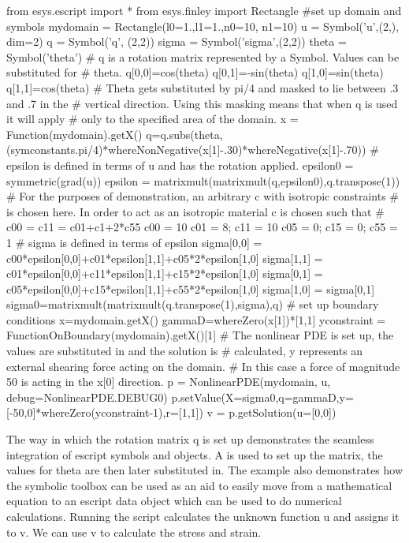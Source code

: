 \begin{python}
from esys.escript import *
from esys.finley import Rectangle
#set up domain and symbols
mydomain = Rectangle(l0=1.,l1=1.,n0=10, n1=10)
u = Symbol('u',(2,), dim=2)
q = Symbol('q', (2,2))
sigma = Symbol('sigma',(2,2))
theta = Symbol('theta')
# q is a rotation matrix represented by a Symbol. Values can be substituted for 
# theta.
q[0,0]=cos(theta)
q[0,1]=-sin(theta)
q[1,0]=sin(theta)
q[1,1]=cos(theta)
# Theta gets substituted by pi/4 and masked to lie between .3 and .7 in the 
# vertical direction. Using this masking means that when q is used it will apply
# only to the specified area of the domain. 
x = Function(mydomain).getX()
q=q.subs(theta,(symconstants.pi/4)*whereNonNegative(x[1]-.30)*whereNegative(x[1]-.70))
# epsilon is defined in terms of u and has the rotation applied. 
epsilon0 = symmetric(grad(u))
epsilon = matrixmult(matrixmult(q,epsilon0),q.transpose(1))
# For the purposes of demonstration, an arbitrary c with isotropic constraints 
# is chosen here. In order to act as an isotropic material c is chosen such that 
# c00 = c11 = c01+c1+2*c55
c00 = 10
c01 = 8; c11 = 10
c05 = 0; c15 = 0; c55 = 1
# sigma is defined in terms of epsilon
sigma[0,0] = c00*epsilon[0,0]+c01*epsilon[1,1]+c05*2*epsilon[1,0]
sigma[1,1] = c01*epsilon[0,0]+c11*epsilon[1,1]+c15*2*epsilon[1,0]
sigma[0,1] = c05*epsilon[0,0]+c15*epsilon[1,1]+c55*2*epsilon[1,0]
sigma[1,0] = sigma[0,1]
sigma0=matrixmult(matrixmult(q.transpose(1),sigma),q)
# set up boundary conditions
x=mydomain.getX()
gammaD=whereZero(x[1])*[1,1]
yconstraint = FunctionOnBoundary(mydomain).getX()[1]
# The nonlinear PDE is set up, the values are substituted in and the solution is
# calculated, y represents an external shearing force acting on the domain. 
# In this case a force of magnitude 50 is acting in the x[0] direction.
p = NonlinearPDE(mydomain, u, debug=NonlinearPDE.DEBUG0)
p.setValue(X=sigma0,q=gammaD,y=[-50,0]*whereZero(yconstraint-1),r=[1,1])
v = p.getSolution(u=[0,0])
\end{python}
The way in which the rotation matrix q is set up demonstrates the seamless integration of escript symbols and \Data objects. A \SYMBOL is used to set up the matrix, the values for theta are then later substituted in. The example also demonstrates how the symbolic toolbox can be used as an aid to easily move from a mathematical equation to an escript data object which can be used to do numerical calculations. 
Running the script calculates the unknown function u and assigns it to v. We can use v to calculate the stress and strain.  
